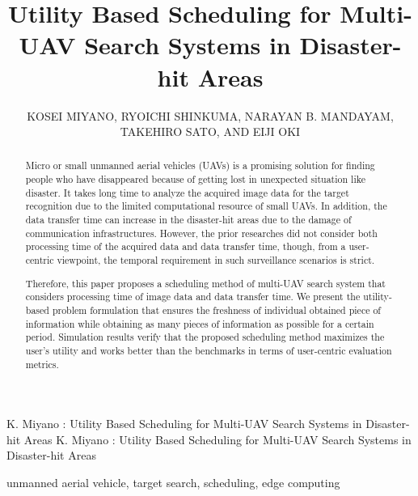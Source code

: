 \documentclass{ieeeaccess}
\begin{document}
\title{Utility Based Scheduling for Multi-UAV Search Systems in Disaster-hit Areas}

\author{\uppercase{Kosei MIYANO, Ryoichi SHINKUMA, NARAYAN B. MANDAYAM, Takehiro SATO, and Eiji OKI}}
\address[1]{Graduate School of Informatics, Kyoto University Yoshida-honmachi, Sakyo-ku, Kyoto 606-8501, Japan}
\address[2]{Wireless Information Network Laboratory (WINLAB), Rutgers University, 671 Route 1 South, North Brunswick, NJ, 08902-3390, USA}

\markboth
{K. Miyano \headeretal: Utility Based Scheduling for Multi-UAV Search Systems in Disaster-hit Areas}
{K. Miyano \headeretal: Utility Based Scheduling for Multi-UAV Search Systems in Disaster-hit Areas}


\begin{IEEEkeywords}
unmanned aerial vehicle, target search, scheduling, edge computing
\end{IEEEkeywords}

\begin{abstract}
Micro or small unmanned aerial vehicles (UAVs) is a promising solution for finding people who have disappeared because of getting lost in unexpected situation like disaster.
It takes long time to analyze the acquired image data for the target recognition due to the limited computational resource of small UAVs.
In addition, the data transfer time can increase in the disaster-hit areas due to the  damage of communication infrastructures.
However, the prior researches did not consider both processing time of the acquired data and data transfer time, though, from a user-centric viewpoint, the temporal requirement in such surveillance scenarios is strict.

Therefore, this paper proposes a scheduling method of multi-UAV search system that considers processing time of image data and data transfer time.
We present the utility-based problem formulation that ensures the freshness of individual obtained piece of information while obtaining as many pieces of information as possible for a certain period.
Simulation results verify that the proposed scheduling method maximizes the user's utility and works better than the benchmarks in terms of user-centric evaluation metrics.
\end{abstract}
\end{document}
